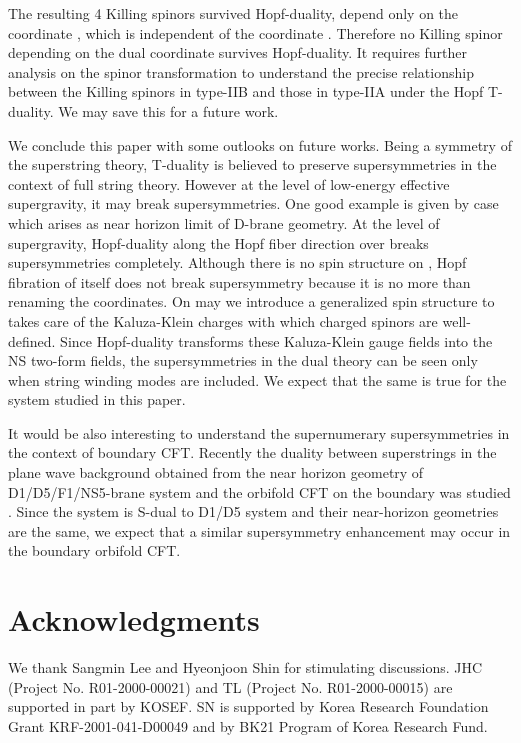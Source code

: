 \documentclass[a4paper,12pt]{article}
\begin{document}
The resulting 4 Killing spinors survived Hopf-duality, depend only on the coordinate \coordHE{}, which is independent of the coordinate \myHighlight{$\bar{\chi}$}\coordHE{}. Therefore no Killing spinor depending on the dual coordinate \myHighlight{$\bar{\chi}$}\coordHE{} survives Hopf-duality. It requires further analysis on the spinor transformation to understand the precise relationship between the Killing spinors in type-IIB and those in type-IIA under the Hopf T-duality. We may save this for a future work. 

We conclude this paper with some outlooks on future works.
Being a symmetry of the superstring theory, T-duality is believed to preserve supersymmetries in the context of full string theory. However at the level of low-energy effective supergravity, it may break supersymmetries. One good example is given by \coordHE{} case \cite{duff2} which arises as near horizon limit of D\coordHE{}-brane geometry. At the level of supergravity, Hopf-duality along the Hopf fiber direction over \coordHE{} breaks supersymmetries completely. Although there is no spin structure on \coordHE{}, Hopf fibration of \coordHE{} itself does not break supersymmetry because it is no more than renaming the coordinates. 
On \coordHE{} may we introduce a generalized spin structure 
to takes care of the Kaluza-Klein charges with which charged spinors are 
well-defined. Since Hopf-duality transforms these Kaluza-Klein gauge fields 
into the NS two-form fields, the supersymmetries in the dual theory can be 
seen only when string winding modes are included. We expect that the same is 
true for the system studied in this paper. 

It would be also interesting to understand the supernumerary supersymmetries 
in the context of boundary CFT. Recently the duality between 
superstrings in the plane wave background obtained from the near horizon 
geometry of D1/D5/F1/NS5-brane system and the orbifold CFT on the boundary was 
studied \cite{maldacena,lunin,strominger}. Since the system is S-dual to D1/D5 
system and their near-horizon geometries are the same, we expect that a similar 
supersymmetry enhancement may occur in the boundary orbifold CFT.   




\section*{Acknowledgments}
We thank Sangmin Lee and Hyeonjoon Shin for stimulating discussions.
JHC (Project No. R01-2000-00021) and TL (Project No. R01-2000-00015) are supported in part by KOSEF. SN is supported by Korea Research Foundation Grant KRF-2001-041-D00049 and by BK21 Program of Korea Research Fund.
\end{document}

